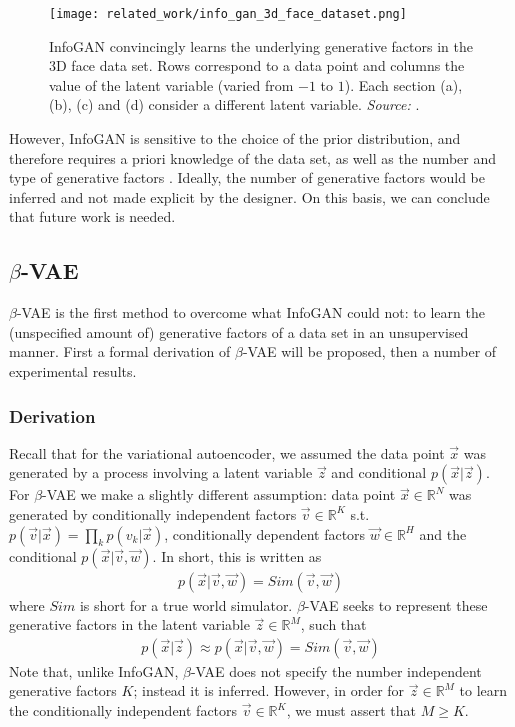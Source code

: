 \begin{figure}[h!]
\centering
\captionsetup{justification=centering}
\texttt{[image: related\_work/info\_gan\_3d\_face\_dataset.png]}
\caption{InfoGAN convincingly learns the underlying generative factors in the 3D face data set. Rows correspond to a data point and columns the value of the latent variable (varied from $-1$ to $1$). Each section (a), (b), (c) and (d) consider a different latent variable. \textit{Source:} \cite{Chen2016}.}
\label{fig:info_gan_3d_face_dataset}
\end{figure}

However, InfoGAN is sensitive to the choice of the prior distribution, and therefore requires a priori knowledge of the data set, as well as the number and type of generative factors \cite{Thiagarajan2016}. Ideally, the number of generative factors would be inferred and not made explicit by the designer. On this basis, we can conclude that future work is needed.

\subsection{$\beta$-VAE}
$\beta$-VAE is the first method to overcome what InfoGAN could not: to learn the (unspecified amount of) generative factors of a data set in an unsupervised manner. First a formal derivation of $\beta$-VAE will be proposed, then a number of experimental results.

\subsubsection{Derivation}
Recall that for the variational autoencoder, we assumed the data point $\vec{x}$ was generated by a process involving a latent variable $\vec{z}$ and conditional $p(\vec{x}|\vec{z})$. For $\beta$-VAE we make a slightly different assumption: data point $\vec{x} \in \mathbb{R}^N$ was generated by conditionally independent factors $\vec{v} \in \mathbb{R}^K$ s.t. $p(\vec{v} | \vec{x}) = \prod_k p(v_k | \vec{x})$, conditionally dependent factors $\vec{w} \in \mathbb{R}^H$ and the conditional $p(\vec{x} | \vec{v}, \vec{w})$. In short, this is written as
\begin{align}
p(\vec{x}|\vec{v}, \vec{w}) = Sim(\vec{v}, \vec{w})
\end{align}
where $Sim$ is short for a true world simulator. $\beta$-VAE seeks to represent these generative factors in the latent variable $\vec{z} \in \mathbb{R}^M$, such that
\begin{align}
p(\vec{x} | \vec{z}) \approx p(\vec{x} | \vec{v}, \vec{w}) = Sim(\vec{v}, \vec{w})
\end{align}
Note that, unlike InfoGAN, $\beta$-VAE does not specify the number independent generative factors $K$; instead it is inferred. However, in order for $\vec{z} \in \mathbb{R}^M$ to learn the conditionally independent factors $\vec{v} \in \mathbb{R}^K$, we must assert that $M \geq K$.

